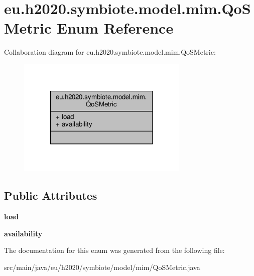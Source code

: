 \hypertarget{enumeu_1_1h2020_1_1symbiote_1_1model_1_1mim_1_1QoSMetric}{}\section{eu.\+h2020.\+symbiote.\+model.\+mim.\+Qo\+S\+Metric Enum Reference}
\label{enumeu_1_1h2020_1_1symbiote_1_1model_1_1mim_1_1QoSMetric}


Collaboration diagram for eu.\+h2020.\+symbiote.\+model.\+mim.\+Qo\+S\+Metric\+:
\nopagebreak
\begin{figure}[H]
\begin{center}
\leavevmode
\includegraphics[width=232pt]{enumeu_1_1h2020_1_1symbiote_1_1model_1_1mim_1_1QoSMetric__coll__graph}
\end{center}
\end{figure}
\subsection*{Public Attributes}
\begin{DoxyCompactItemize}
\item 
\mbox{\label{enumeu_1_1h2020_1_1symbiote_1_1model_1_1mim_1_1QoSMetric_a289f03d941cf7170d89b492620f2fa9e}} 
{\bfseries load}
\item 
\mbox{\label{enumeu_1_1h2020_1_1symbiote_1_1model_1_1mim_1_1QoSMetric_ab21238884ab070496cf455cedf4bc606}} 
{\bfseries availability}
\end{DoxyCompactItemize}


The documentation for this enum was generated from the following file\+:\begin{DoxyCompactItemize}
\item 
src/main/java/eu/h2020/symbiote/model/mim/Qo\+S\+Metric.\+java\end{DoxyCompactItemize}
